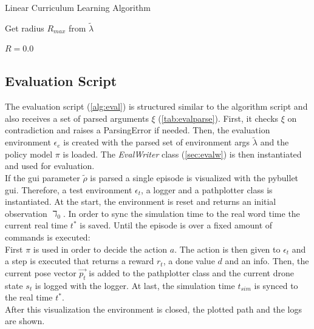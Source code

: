 \newpage

\begin{algorithm}
	\caption{Linear Curriculum Learning Algorithm}
	\label{alg:curri}
	
	Get radius $R_{max}$ from $\tilde{\lambda}$
	
	$R = 0.0$
	
\end{algorithm}

\subsection{Evaluation Script}
The evaluation script (\cref{alg:eval}) is structured similar to the algorithm script and also receives a set of
parsed arguments $\xi$ (\cref{tab:evalparse}). 
First, it checks $\xi$ on contradiction and raises a ParsingError if needed. 
Then, the evaluation environment $\epsilon_e$ is created with the parsed set of environment args $\tilde{\lambda}$ and the policy model $\pi$ is loaded. 
The \emph{EvalWriter} class (\cref{sec:evalw}) is then instantiated and used for evaluation.\\
If the gui parameter $\tilde{\rho}$ is parsed a single episode is visualized with the pybullet gui. 
Therefore, a test environment $\epsilon_t$, a logger and a pathplotter class is instantiated.
At the start, the environment is reset and returns an initial observation $\daleth_0$. 
In order to sync the simulation time to the real word time the current real time $t^*$ is saved.
Until the episode is over a fixed amount of commands is executed:\\
\newline
First $\pi$ is used in order to decide the action $a$. 
The action is then given to $\epsilon_t$ and a step is executed that returns a reward $r_t$, a done value $d$ and an info.
Then, the current pose vector $\overrightarrow{p_t}$ is added to the pathplotter class and the current drone state $s_t$ is logged with the logger. 
At last, the simulation time $t_{sim}$ is synced to the real time $t^*$.\\
\newline
After this visualization the environment is closed, the plotted path and the logs are shown.

